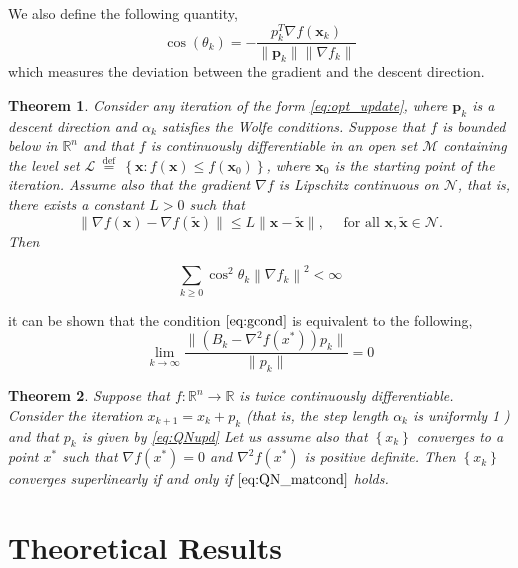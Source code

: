 \documentclass[12pt]{report}
\newtheorem{theorem}{Theorem}
\begin{document}
We also define the following quantity,
\begin{equation}
	\cos(\theta_k) =- \frac{p_k^{T}\nabla f(\bm x_k)}{\|\bm p_k\| \|\nabla f_k\|}
\end{equation}
which measures the deviation between the gradient and the descent direction.
\begin{theorem}
	\label{thm:thm1}
	Consider any iteration of the form \eqref{eq:opt_update}, where $\bm p_k$ is a descent direction and $\alpha_k$ satisfies the Wolfe conditions. Suppose that $f$ is bounded below in $\mathbb{R}^n$ and that $f$ is continuously differentiable in an open set $\mathcal{M}$ containing the level set $\mathcal{L} \stackrel{\text { def }}{=}\left\{\bm x: f(\bm x) \leq f\left(\bm x_0\right)\right\}$, where $\bm x_0$ is the starting point of the iteration. Assume also that the gradient $\nabla f$ is Lipschitz continuous on $\mathcal{N}$, that is, there exists a constant $L>0$ such that
	\begin{equation}
		\|\nabla f(\bm x)-\nabla f(\tilde{\bm x})\| \leq L\|\bm x-\tilde{\bm x}\|, \quad \text { for all } \bm x, \tilde{\bm x} \in \mathcal{N} .
	\end{equation}
	Then

	\begin{equation}
		\sum_{k \geq 0} \cos ^2 \theta_k\left\|\nabla f_k\right\|^2<\infty \label{eq:cos_conv}
	\end{equation}
\end{theorem}
it can be shown that the condition $\eqref{eq:gcond}$ is equivalent to the following,
\begin{equation}
	\lim_{k \to \infty} \frac{\|(B_{k} - \nabla^2f(x^{*}))p_k \|}{\|p_k\|} = 0 \label{eq:QN_matcond}
\end{equation}
\begin{theorem}
	\label{thm:thm2}
	Suppose that $f: \mathbb{R}^n \rightarrow \mathbb{R}$ is twice continuously differentiable. Consider the iteration $x_{k+1}=x_k+p_k$ (that is, the step length $\alpha_k$ is uniformly 1 ) and that $p_k$ is given by \eqref{eq:QNupd} Let us assume also that $\left\{x_k\right\}$ converges to a point $x^*$ such that $\nabla f\left(x^*\right)=0$ and $\nabla^2 f\left(x^*\right)$ is positive definite. Then $\left\{x_k\right\}$ converges superlinearly if and only if $\eqref{eq:QN_matcond}$ holds.
\end{theorem}
\section{Theoretical Results}
\end{document}
